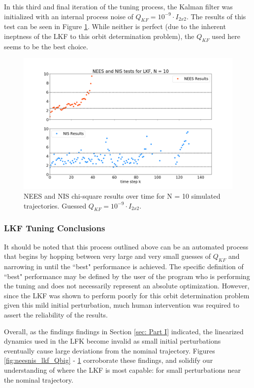 \documentclass[11pt, a4paper]{article}
\begin{document}
In this third and final iteration of the tuning process, the Kalman filter was initialized with an internal process noise of $Q_{KF} = 10^{-9} \cdot I_{2 x 2}$. 
The results of this test can be seen in Figure \ref{fig:neesnis_lkf}.
While neither is perfect (due to the inherent ineptness of the LKF to this orbit determination problem), the $Q_{KF}$ used here seems to be the best choice. 

\begin{figure}[H]
	\centering
	\includegraphics[width=\textwidth]{Figures/NEESNIS_lkf_N10Q1.0E-09.png}
	\caption{NEES and NIS chi-square results over time for N = 10 simulated trajectories. Guessed $Q_{KF} = 10^{-9} \cdot I_{2 x 2}$.}
	\label{fig:neesnis_lkf}
\end{figure}

\subsubsection{LKF Tuning Conclusions}
It should be noted that this process outlined above can be an automated process that begins by hopping between very large and very small guesses of $Q_{KF}$ and narrowing in until the ``best" performance is achieved. 
The specific definition of ``best" performance may be defined by the user of the program who is performing the tuning and does not necessarily represent an absolute optimization. 
However, since the LKF was shown to perform poorly for this orbit determination problem given this mild initial perturbation, much human intervention was required to assert the reliability of the results. 

Overall, as the findings findings in Section \ref{sec: Part I} indicated, the linearized dynamics used in the LFK become invalid as small initial perturbations eventually cause large deviations from the nominal trajectory. 
Figures \ref{fig:neesnis_lkf_Qbig} - \ref{fig:neesnis_lkf} corroborate these findings, and solidify our understanding of where the LKF is most capable: for small perturbations near the nominal trajectory.  
\end{document}
